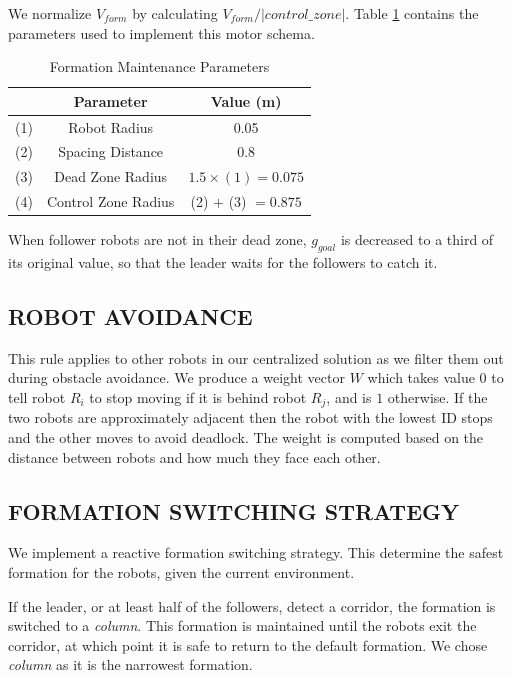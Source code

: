 \documentclass[letterpaper, 10 pt, conference]{ieeeconf}  %
\begin{document}
We normalize $V_{form}$ by calculating $V_{form}/\lvert control\_zone\rvert$. Table \ref{table_formation} contains the parameters used to implement this motor schema.

\begin{table}[h]
\begin{center}
\begin{tabular}{|c|c|c|}
\hline
& Parameter & Value (m) \\
\hline
(1) & Robot Radius             & 0.05 \\
(2) & Spacing Distance        & 0.8 \\
(3) & Dead Zone Radius      & $1.5 \times (1) = 0.075$ \\
(4) & Control Zone Radius    & (2) $+$ (3) $=0.875$ \\
\hline
\end{tabular}
\end{center}
\caption{Formation Maintenance Parameters}
\label{table_formation}
\end{table}

When follower robots are not in their dead zone, $g_{goal}$ is decreased to a third of its original value, so that the leader waits for the followers to catch it.

\subsection{ROBOT AVOIDANCE}

This rule applies to other robots in our centralized solution as we filter them out during obstacle avoidance. We produce a weight vector $W$ which takes value $0$ to tell robot $R_i$ to stop moving if it is behind robot $R_j$, and is $1$ otherwise. If the two robots are approximately adjacent then the robot with the lowest ID stops and the other moves to avoid deadlock. The weight is computed based on the distance between robots and how much they face each other.

\subsection{FORMATION SWITCHING STRATEGY}

We implement a reactive formation switching strategy. This determine the safest formation for the robots, given the current environment.

If the leader, or at least half of the followers, detect a corridor, the formation is switched to a \textit{column}. This formation is maintained until the robots exit the corridor, at which point it is safe to return to the default formation. We chose \textit{column} as it is the narrowest formation.
\end{document}
